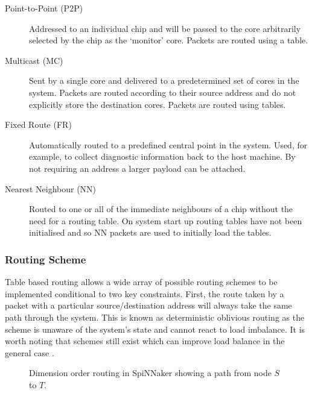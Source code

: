 			\begin{description}
				
				\item[Point-to-Point (P2P)] Addressed to an individual chip and will be
				passed to the core arbitrarily selected by the chip as the `monitor'
				core. Packets are routed using a table.
				
				\item[Multicast (MC)] Sent by a single core and delivered to a
				predetermined set of cores in the system. Packets are routed according
				to their source address and do not explicitly store the destination
				cores. Packets are routed using tables.
				
				\item[Fixed Route (FR)] Automatically routed to a predefined central
				point in the system. Used, for example, to collect diagnostic
				information back to the host machine. By not requiring an address a
				larger payload can be attached.
				
				\item[Nearest Neighbour (NN)] Routed to one or all of the immediate
				neighbours of a chip without the need for a routing table. On system
				start up routing tables have not been initialised and so NN packets are
				used to initially load the tables.
				
			\end{description}
			
			\subsubsection{Routing Scheme}
				
				
				Table based routing allows a wide array of possible routing schemes to
				be implemented conditional to two key constraints. First, the route
				taken by a packet with a particular source/destination address will
				always take the same path through the system. This is known as
				deterministic oblivious routing as the scheme is unaware of the system's
				state and cannot react to load imbalance. It is worth noting that
				schemes still exist which can improve load balance in the general case
				\cite{singh02}.
				
				\begin{figure}
					\center
					
					\caption[Dimension order routing in SpiNNaker.]{Dimension order routing
					in SpiNNaker showing a path from node $S$ to $T$.}
					\label{fig:dimension-order-routing}
				\end{figure}
				
